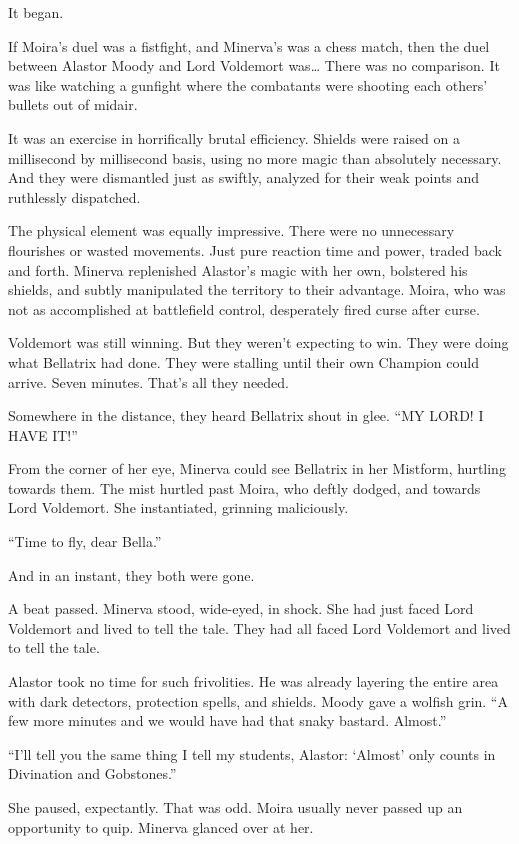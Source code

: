 It began.

If Moira’s duel was a fistfight, and Minerva’s was a chess match, then the duel between Alastor Moody and Lord Voldemort was… There was no comparison. It was like watching a gunfight where the combatants were shooting each others’ bullets out of midair.

It was an exercise in horrifically brutal efficiency. Shields were raised on a millisecond by millisecond basis, using no more magic than absolutely necessary. And they were dismantled just as swiftly, analyzed for their weak points and ruthlessly dispatched.

The physical element was equally impressive. There were no unnecessary flourishes or wasted movements. Just pure reaction time and power, traded back and forth. Minerva replenished Alastor’s magic with her own, bolstered his shields, and subtly manipulated the territory to their advantage. Moira, who was not as accomplished at battlefield control, desperately fired curse after curse.

Voldemort was still winning. But they weren’t expecting to win. They were doing what Bellatrix had done. They were stalling until their own Champion could arrive. Seven minutes. That’s all they needed.

Somewhere in the distance, they heard Bellatrix shout in glee. “MY LORD! I HAVE IT!”

From the corner of her eye, Minerva could see Bellatrix in her Mistform, hurtling towards them. The mist hurtled past Moira, who deftly dodged, and towards Lord Voldemort. She instantiated, grinning maliciously.

“Time to fly, dear Bella.”

And in an instant, they both were gone.

A beat passed. Minerva stood, wide-eyed, in shock. She had just faced Lord Voldemort and lived to tell the tale. They had all faced Lord Voldemort and lived to tell the tale.

Alastor took no time for such frivolities. He was already layering the entire area with dark detectors, protection spells, and shields. Moody gave a wolfish grin. “A few more minutes and we would have had that snaky bastard. Almost.”

“I’ll tell you the same thing I tell my students, Alastor: ‘Almost’ only counts in Divination and Gobstones.”

She paused, expectantly. That was odd. Moira usually never passed up an opportunity to quip. Minerva glanced over at her.


